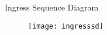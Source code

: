 \begin{frame}{Ingress Sequence Diagram}
  \begin{figure}
    \centering
    \texttt{[image: ingresssd]}
  \end{figure}
\end{frame}